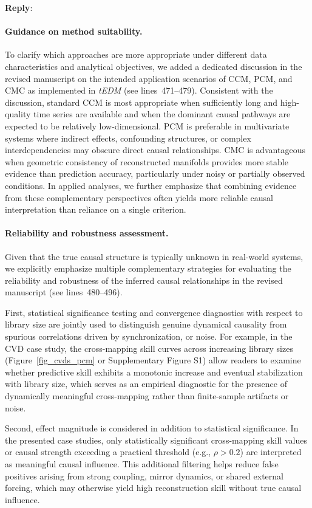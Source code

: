 \documentclass[11pt]{article}
\newenvironment{reply}
   {\medskip \noindent \color{blue} \begin{sf}\textbf{Reply}:\  }
   {\medskip \par \end{sf}}
\begin{document}
\begin{reply}
\paragraph{Guidance on method suitability.}
To clarify which approaches are more appropriate under different data characteristics and analytical objectives, we added a dedicated discussion in the revised manuscript on the intended application scenarios of CCM, PCM, and CMC as implemented in \textit{tEDM} (see lines~471--479). Consistent with the discussion, standard CCM is most appropriate when sufficiently long and high-quality time series are available and when the dominant causal pathways are expected to be relatively low-dimensional. PCM is preferable in multivariate systems where indirect effects, confounding structures, or complex interdependencies may obscure direct causal relationships. CMC is advantageous when geometric consistency of reconstructed manifolds provides more stable evidence than prediction accuracy, particularly under noisy or partially observed conditions. In applied analyses, we further emphasize that combining evidence from these complementary perspectives often yields more reliable causal interpretation than reliance on a single criterion.

\paragraph{Reliability and robustness assessment.}
Given that the true causal structure is typically unknown in real-world systems, we explicitly emphasize multiple complementary strategies for evaluating the reliability and robustness of the inferred causal relationships in the revised manuscript (see lines~480--496). 

First, statistical significance testing and convergence diagnostics with respect to library size are jointly used to distinguish genuine dynamical causality from spurious correlations driven by synchronization, or noise. For example, in the CVD case study, the cross-mapping skill curves across increasing library sizes (Figure~\ref{fig_cvds_pcm} or Supplementary Figure S1) allow readers to examine whether predictive skill exhibits a monotonic increase and eventual stabilization with library size, which serves as an empirical diagnostic for the presence of dynamically meaningful cross-mapping rather than finite-sample artifacts or noise.

Second, effect magnitude is considered in addition to statistical significance. In the presented case studies, only statistically significant cross-mapping skill values or causal strength exceeding a practical threshold (e.g., $\rho > 0.2$) are interpreted as meaningful causal influence. This additional filtering helps reduce false positives arising from strong coupling, mirror dynamics, or shared external forcing, which may otherwise yield high reconstruction skill without true causal influence.


\end{reply}
\end{document}
